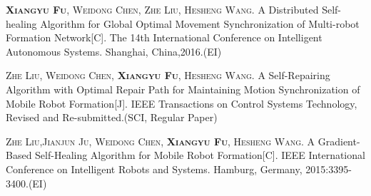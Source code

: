 
\begin{publications}{99}
    \item\textsc{\textbf{Xiangyu Fu}, Weidong Chen, Zhe Liu, Hesheng Wang}. {A Distributed Self-healing Algorithm for Global Optimal Movement Synchronization of Multi-robot Formation Network}[C]. The 14th International Conference on Intelligent Autonomous Systems. Shanghai, China,2016.(EI)
    \item\textsc{Zhe Liu, Weidong Chen, \textbf{Xiangyu Fu}, Hesheng Wang}. {A Self-Repairing Algorithm with Optimal Repair Path for Maintaining Motion Synchronization of Mobile Robot Formation}[J]. IEEE Transactions on Control Systems Technology, Revised and Re-submitted.(SCI, Regular Paper)
    \item\textsc{Zhe Liu,Jianjun Ju, Weidong Chen, \textbf{Xiangyu Fu}, Hesheng Wang}. {A Gradient-Based Self-Healing Algorithm for Mobile Robot Formation}[C]. IEEE International Conference on Intelligent Robots and Systems. Hamburg, Germany, 2015:3395-3400.(EI)
\end{publications}

